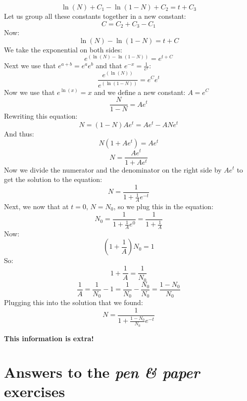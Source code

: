 \documentclass{article}\usepackage[]{graphicx}\usepackage[]{color}
\begin{document}
\begin{equation}
\ln(N) + C_1 - \ln(1-N) + C_2 = t + C_3
\end{equation}
Let us group all these constants together in a new constant:
\begin{equation}
C = C_2 + C_3 - C_1
\end{equation}
Now:
\begin{equation}
\ln(N) - \ln(1-N) = t + C
\end{equation}
We take the exponential on both sides:
\begin{equation}
e^{\left(\ln(N) - \ln(1-N)\right)} = e^{t + C}
\end{equation}
Next we use that $e^{a+b} = e^a e^b$ and that $e^{-x}=\frac{1}{e^x}$:
\begin{equation}
\frac{e^{\left(\ln(N)\right)}}{e^{\left(\ln(1-N)\right)}} = e^C e^t
\end{equation}
Now we use that $e^{\ln(x)}=x$ and we define a new constant: $A=e^C$
\begin{equation}
\frac{N}{1-N} = A e^t
\end{equation}
Rewriting this equation:
\begin{equation}
N = (1-N) A e^t = A e^t - A N e^t
\end{equation}
And thus:
\begin{equation}
N (1+Ae^t) = A e^t
\end{equation}
\begin{equation}
N = \frac{Ae^t}{1+Ae^t}
\end{equation}
Now we divide the numerator and the denominator on the right side by $Ae^t$ to get the solution to the equation:
\begin{equation}
N = \frac{1}{1+\frac{1}{A}e^{-t}}
\end{equation}
Next, we now that at $t=0$, $N=N_0$, so we plug this in the equation:
\begin{equation}
N_0 = \frac{1}{1+\frac{1}{A}e^{0}} = \frac{1}{1+\frac{1}{A}}
\end{equation}
Now:
\begin{equation}
\left(1+\frac{1}{A}\right) N_0 = 1
\end{equation}
So:
\begin{equation}
1+\frac{1}{A} = \frac{1}{N_0}
\end{equation}
\begin{equation}
\frac{1}{A} = \frac{1}{N_0} -1 = \frac{1}{N_0} - \frac{N_0}{N_0} = \frac{1-N_0}{N_0} 
\end{equation}
Plugging this into the solution that we found:
\begin{equation}
N = \frac{1}{1+\frac{1-N_0}{N_0}e^{-t}}
\end{equation}

\textbf{This information is extra!\\}
\section{Answers to the \textit{pen \& paper} exercises}
\shipoutAnswer
\end{document}
